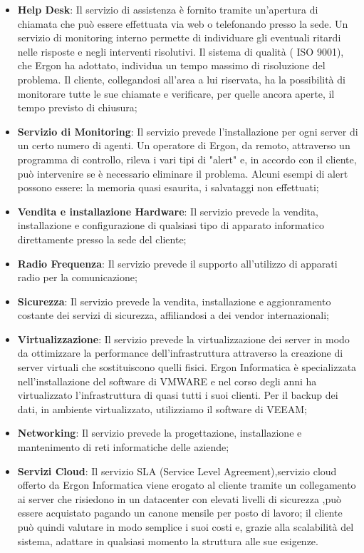 \begin{itemize}
	\item \textbf{Help Desk}: Il servizio di assistenza è fornito tramite un'apertura di chiamata che può essere effettuata via web o telefonando presso la sede.
	Un servizio di monitoring  interno permette di individuare gli eventuali ritardi nelle risposte e negli interventi risolutivi. Il sistema di qualità ( ISO 9001), che Ergon ha adottato, individua un tempo massimo di risoluzione del problema.
	Il cliente, collegandosi all'area a lui riservata, ha la possibilità di monitorare tutte le sue chiamate e verificare, per quelle ancora aperte, il tempo  previsto di chiusura;
	
	\item \textbf{Servizio di Monitoring}: Il servizio prevede l'installazione per ogni server di un certo numero di agenti.
	Un operatore di Ergon, da remoto, attraverso un programma di controllo, rileva i vari tipi di "alert" e, in accordo con il cliente,  può intervenire se è necessario eliminare il problema. Alcuni esempi di alert possono essere: la memoria quasi esaurita, i salvataggi non effettuati;
	
	\item \textbf{Vendita e installazione Hardware}: Il servizio prevede la vendita, installazione e configurazione di qualsiasi tipo di apparato informatico direttamente presso la sede del cliente;
	
	\item \textbf{Radio Frequenza}: Il servizio prevede il supporto all'utilizzo di apparati radio per la comunicazione;
	
	\item \textbf{Sicurezza}: Il servizio prevede la vendita, installazione e aggionramento costante dei servizi di sicurezza, affiliandosi a dei vendor internazionali;
	
	\item \textbf{Virtualizzazione}: Il servizio prevede la virtualizzazione dei server in modo da ottimizzare la performance dell'infrastruttura attraverso la creazione di server virtuali che sostituiscono quelli fisici. Ergon Informatica è specializzata nell'installazione del software di VMWARE e nel corso degli anni ha virtualizzato l'infrastruttura di quasi tutti i suoi clienti.
	Per il backup dei dati,  in ambiente virtualizzato, utilizziamo il software di VEEAM;
	
	\item \textbf{Networking}: Il servizio prevede la progettazione, installazione e mantenimento di reti informatiche delle aziende;
	
	\item \textbf{Servizi Cloud}: Il servizio SLA (Service Level Agreement),servizio cloud offerto da Ergon Informatica viene erogato al cliente tramite un collegamento ai server che risiedono in un datacenter con elevati livelli di sicurezza  ,può essere acquistato pagando un canone mensile per posto di lavoro; il cliente può quindi valutare in modo semplice i suoi costi e, grazie alla scalabilità del sistema, adattare in qualsiasi momento la struttura alle sue esigenze.
\end{itemize}

